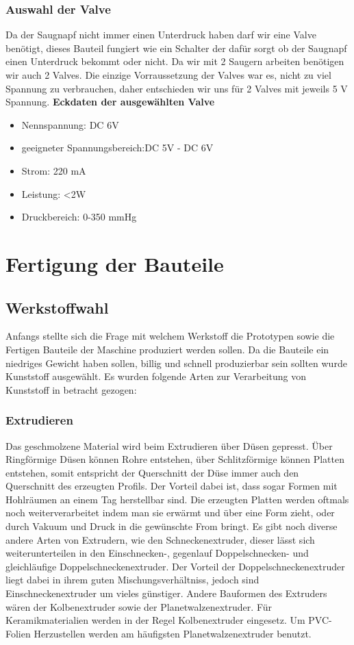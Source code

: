 \subsubsection{Auswahl der Valve}
Da der Saugnapf nicht immer einen Unterdruck haben darf wir eine Valve benötigt, dieses Bauteil fungiert wie ein
Schalter der dafür sorgt ob der Saugnapf einen Unterdruck bekommt oder nicht. Da wir mit 2 Saugern arbeiten benötigen wir
auch 2 Valves. Die einzige Vorraussetzung der Valves war es, nicht zu viel Spannung zu verbrauchen, daher entschieden
wir uns für 2 Valves mit jeweils 5 V Spannung.
\textbf{Eckdaten der ausgewählten Valve}
\begin{itemize}
    \item Nennspannung: DC 6V
    \item geeigneter Spannungsbereich:DC 5V - DC 6V
    \item Strom: 220 mA
    \item Leistung: <2W
    \item Druckbereich: 0-350 mmHg
\end{itemize}




\section{Fertigung der Bauteile}
\subsection{Werkstoffwahl}
Anfangs stellte sich die Frage mit welchem Werkstoff die Prototypen sowie die Fertigen Bauteile der
Maschine produziert werden sollen. Da die Bauteile ein niedriges Gewicht haben sollen, billig und schnell produzierbar
sein sollten wurde Kunststoff ausgewählt. Es wurden folgende Arten zur Verarbeitung von Kunststoff in betracht gezogen:
\subsubsection{Extrudieren}
Das geschmolzene Material wird beim Extrudieren über Düsen gepresst. Über Ringförmige Düsen können Rohre entstehen,
über Schlitzförmige können Platten entstehen, somit entspricht der Querschnitt der Düse immer auch den Querschnitt
des erzeugten Profils. Der Vorteil dabei ist, dass sogar Formen mit Hohlräumen an einem Tag herstellbar sind.
Die erzeugten Platten werden oftmals noch weiterverarbeitet indem man sie erwärmt und über eine Form zieht, oder durch
Vakuum und Druck in die gewünschte From bringt.
Es gibt noch diverse andere Arten von Extrudern, wie den Schneckenextruder, dieser lässt sich weiterunterteilen in den
Einschnecken-, gegenlauf Doppelschnecken- und gleichläufige Doppelschneckenextruder. Der Vorteil der Doppelschneckenextruder
liegt dabei in ihrem guten Mischungsverhältniss, jedoch sind Einschneckenextruder um vieles günstiger.
Andere Bauformen des Extruders wären der Kolbenextruder sowie der Planetwalzenextruder.
Für Keramikmaterialien werden in der Regel Kolbenextruder eingesetz.
Um PVC-Folien Herzustellen werden am häufigsten Planetwalzenextruder benutzt.

